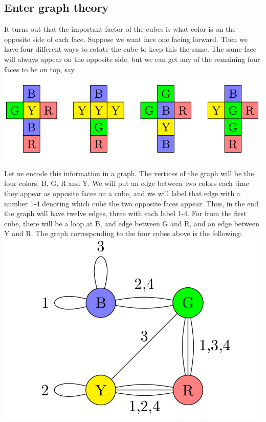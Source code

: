 \documentclass[10pt,]{book}
\theoremstyle{plain}
\theoremstyle{definition}
\theoremstyle{definition}
\theoremstyle{definition}
\begin{document}
\subsection[{Enter graph theory}]{Enter graph theory}\label{subsection-11}
\hypertarget{p-58}{}%
It turns out that the important factor of the cubes is what color is on the opposite side of each face.  Suppose we want face one facing forward.  Then we have four different ways to rotate the cube to keep this the same.  The same face will always appear on the opposite side, but we can get any of the remaining four faces to be on top, say.%
\includegraphics[width=1\linewidth]{images/ImpossibleCubes.png}
\hypertarget{p-59}{}%
Let us encode this information in a graph.   The vertices of the graph will be the four colors, B, G, R and Y. We will put an edge between two colors each time they appear as opposite faces on a cube, and we will label that edge with a number 1-4 denoting which cube the two opposite faces appear. Thus, in the end the graph will have twelve edges, three with each label 1-4. For from the first cube, there will be a loop at B, and edge between G and R, and an edge between Y and R.  The graph corresponding to the four cubes above is the following:%
\includegraphics[width=1\linewidth]{images/InstantInsanityImpossibleGraph.png}
\typeout{************************************************}
\typeout{************************************************}
\end{document}
